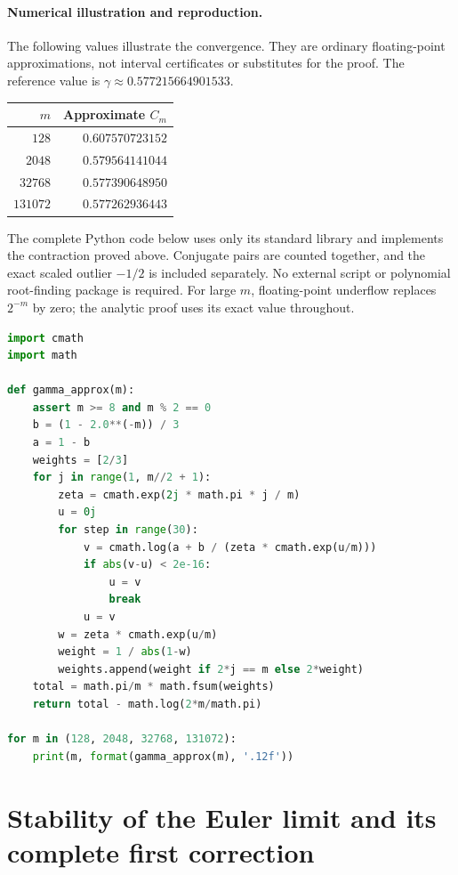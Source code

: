 \documentclass[11pt,a4paper]{article}
\theoremstyle{definition}
\theoremstyle{remark}
\numberwithin{equation}{section}
\begin{document}
\paragraph{Numerical illustration and reproduction.}
The following values illustrate the convergence. They are ordinary
floating-point approximations, not interval certificates or substitutes
for the proof. The reference value is
$\gamma\approx0.577215664901533$.
\begin{center}
\begin{tabular}{r r}
$m$ & Approximate $C_m$\\\hline
$128$ & $0.607570723152$\\
$2048$ & $0.579564141044$\\
$32768$ & $0.577390648950$\\
$131072$ & $0.577262936443$
\end{tabular}
\end{center}
The complete Python code below uses only its standard library and
implements the contraction proved above. Conjugate pairs are counted
together, and the exact scaled outlier $-1/2$ is included separately.
No external script or polynomial root-finding package is required.
For large $m$, floating-point underflow replaces $2^{-m}$ by zero;
the analytic proof uses its exact value throughout.
\begingroup\small
\begin{lstlisting}[language=Python]
import cmath
import math

def gamma_approx(m):
    assert m >= 8 and m % 2 == 0
    b = (1 - 2.0**(-m)) / 3
    a = 1 - b
    weights = [2/3]
    for j in range(1, m//2 + 1):
        zeta = cmath.exp(2j * math.pi * j / m)
        u = 0j
        for step in range(30):
            v = cmath.log(a + b / (zeta * cmath.exp(u/m)))
            if abs(v-u) < 2e-16:
                u = v
                break
            u = v
        w = zeta * cmath.exp(u/m)
        weight = 1 / abs(1-w)
        weights.append(weight if 2*j == m else 2*weight)
    total = math.pi/m * math.fsum(weights)
    return total - math.log(2*m/math.pi)

for m in (128, 2048, 32768, 131072):
    print(m, format(gamma_approx(m), '.12f'))
\end{lstlisting}
\endgroup



\section{Stability of the Euler limit and its complete first correction}
\label{C:sec:gamma-stability-refinement}
\end{document}
